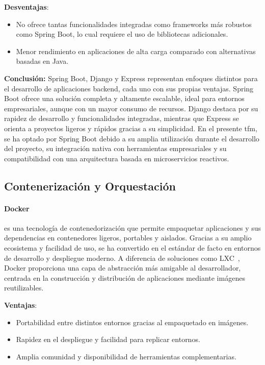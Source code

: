 \textbf{Desventajas}:
\begin{itemize}
    \item No ofrece tantas funcionalidades integradas como \glspl{framework} más robustos como Spring Boot, lo cual requiere el uso de bibliotecas adicionales.
    \item Menor rendimiento en aplicaciones de alta carga comparado con alternativas basadas en Java.
\end{itemize}
\textbf{Conclusión:} Spring Boot, Django y Express representan enfoques distintos para el desarrollo de aplicaciones \gls{backend}, cada uno con sus propias ventajas. Spring Boot ofrece una solución completa y altamente escalable, ideal para entornos empresariales, aunque con un mayor consumo de recursos. Django destaca por su rapidez de desarrollo y funcionalidades integradas, mientras que Express se orienta a proyectos ligeros y rápidos gracias a su simplicidad. En el presente \gls{tfm}, se ha optado por Spring Boot debido a su amplia utilización durante el desarrollo del proyecto, su integración nativa con herramientas empresariales y su compatibilidad con una arquitectura basada en microservicios reactivos.

\subsection{Contenerización y Orquestación}

\paragraph{Docker~\cite{docker}} es una tecnología de contenedorización que permite empaquetar aplicaciones y sus dependencias en contenedores ligeros, portables y aislados. Gracias a su amplio ecosistema y facilidad de uso, se ha convertido en el estándar de facto en entornos de desarrollo y despliegue moderno. A diferencia de soluciones como LXC~\cite{lxc}, Docker proporciona una capa de abstracción más amigable al desarrollador, centrada en la construcción y distribución de aplicaciones mediante imágenes reutilizables.

\textbf{Ventajas}:
\begin{itemize}
    \item Portabilidad entre distintos entornos gracias al empaquetado en imágenes.
    \item Rapidez en el despliegue y facilidad para replicar entornos.
    \item Amplia comunidad y disponibilidad de herramientas complementarias.
\end{itemize}

